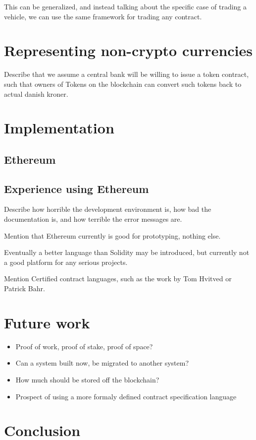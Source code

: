 \documentclass[oneside,a4paper,10pts,article]{memoir}
\begin{document}



This can be generalized, and instead talking about the specific case
of trading a vehicle, we can use the same framework for trading any
contract.


\chapter{Representing non-crypto currencies}
\label{sec:currency}
Describe that we assume a central bank will be willing to issue a
token contract, such that owners of Tokens on the blockchain can
convert such tokens back to actual danish kroner.

\chapter{Implementation}
\label{sec:implementation}

\section{Ethereum}

\section{Experience using Ethereum}
Describe how horrible the development environment is, how bad the
documentation is, and how terrible the error messages are.

Mention that Ethereum currently is good for prototyping, nothing else. 

Eventually a better language than Solidity may be introduced, but
currently not a good platform for any serious projects.

Mention Certified contract languages, such as the work by Tom Hvitved
or Patrick Bahr.

\chapter{Future work}
\label{sec:futurework}

\begin{itemize}
\item Proof of work, proof of stake, proof of space?
\item Can a system built now, be migrated to another system?
\item How much should be stored off the blockchain?
\item Prospect of using a more formaly defined contract specification language
\end{itemize}

\chapter{Conclusion}
\label{sec:conclusion}
\end{document}
